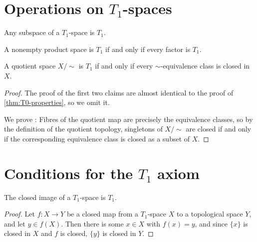 \documentclass[article, a4paper, 11pt, oneside]{memoir}
\numberwithin{equation}{chapter}
\begin{document}
\section[Operations on T1-spaces][Operations on $T_1$-spaces]{Operations on $T_1$-spaces}

\begin{proposition}
    \label{thm:T1-properties}
    \begin{enumprop}
        \item \label{enum:T1-subspace} Any subspace of a $T_1$-space is $T_1$.
        \item A nonempty product space is $T_1$ if and only if every factor is $T_1$.
        \item \label{enum:T1-quotient} A quotient space $X/{\sim}$ is $T_1$ if and only if every $\sim$-equivalence class is closed in $X$.
    \end{enumprop}
\end{proposition}

\begin{proof}
    The proof of the first two claims are almost identical to the proof of \cref{thm:T0-properties}, so we omit it.

    We prove : Fibres of the quotient map are precisely the equivalence classes, so by the definition of the quotient topology, singletons of $X/{\sim}$ are closed if and only if the corresponding equivalence class is closed as a subset of $X$.
\end{proof}


\section[Conditions for the T1 axiom]{Conditions for the $T_1$ axiom}

\begin{proposition}
    The closed image\footnotemark{} of a $T_1$-space is $T_1$.
\end{proposition}

\begin{proof}
    Let $f \colon X \to Y$ be a closed map from a $T_1$-space $X$ to a topological space $Y$, and let $y \in f(X)$. Then there is some $x \in X$ with $f(x) = y$, and since $\{x\}$ is closed in $X$ and $f$ is closed, $\{y\}$ is closed in $Y$.
\end{proof}
\end{document}
